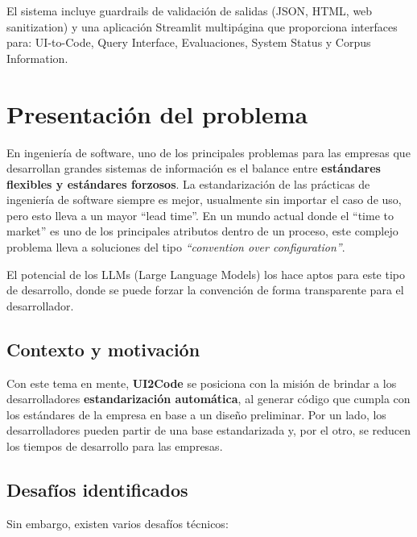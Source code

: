 \documentclass[12pt,a4paper]{article}
\begin{document}
El sistema incluye guardrails de validación de salidas (JSON, HTML, web sanitization) y una aplicación Streamlit multipágina que proporciona interfaces para: UI-to-Code, Query Interface, Evaluaciones, System Status y Corpus Information.

\section{Presentación del problema}

En ingeniería de software, uno de los principales problemas para las empresas que desarrollan grandes sistemas de información es el balance entre \textbf{estándares flexibles y estándares forzosos}. La estandarización de las prácticas de ingeniería de software siempre es mejor, usualmente sin importar el caso de uso, pero esto lleva a un mayor ``lead time''. En un mundo actual donde el ``time to market'' es uno de los principales atributos dentro de un proceso, este complejo problema lleva a soluciones del tipo \textit{``convention over configuration''}. 

El potencial de los LLMs (Large Language Models) los hace aptos para este tipo de desarrollo, donde se puede forzar la convención de forma transparente para el desarrollador.

\subsection{Contexto y motivación}

Con este tema en mente, \textbf{UI2Code} se posiciona con la misión de brindar a los desarrolladores \textbf{estandarización automática}, al generar código que cumpla con los estándares de la empresa en base a un diseño preliminar. Por un lado, los desarrolladores pueden partir de una base estandarizada y, por el otro, se reducen los tiempos de desarrollo para las empresas.

\subsection{Desafíos identificados}

Sin embargo, existen varios desafíos técnicos:
\end{document}
